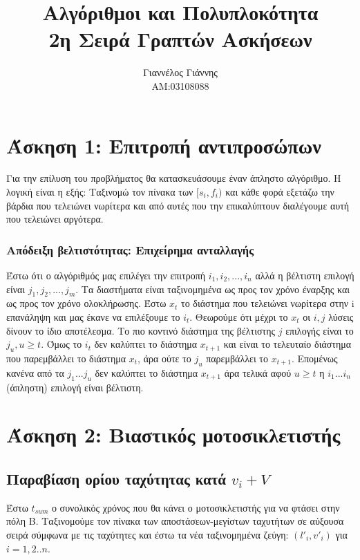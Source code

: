 \documentclass[a4paper,12pt]{report}
\title{ Αλγόριθμοι και Πολυπλοκότητα \\ 2η Σειρά Γραπτών Ασκήσεων}
\author{Γιαννέλος Γιάννης\\ΑΜ:03108088}
\begin{document}
\maketitle

\section*{Άσκηση 1: Επιτροπή αντιπροσώπων}
Για την επίλυση του προβλήματος θα κατασκευάσουμε έναν άπληστο αλγόριθμο. Η λογική είναι η εξής: Ταξινομώ τον πίνακα των $[s_i,f_i)$ και κάθε φορά εξετάζω την βάρδια που τελειώνει νωρίτερα και από αυτές που την επικαλύπτουν διαλέγουμε αυτή που τελειώνει αργότερα.
\subsubsection*{Απόδειξη βελτιστότητας: Επιχείρημα ανταλλαγής}
Έστω ότι ο αλγόριθμός μας επιλέγει την επιτροπή $i_1,i_2,...,i_n$ αλλά η βέλτιστη επιλογή είναι $j_1,j_2,...,j_m$. Τα διαστήματα είναι ταξινομημένα ως προς τον χρόνο έναρξης και ως προς τον χρόνο ολοκλήρωσης. Έστω $x_t$ το διάστημα που τελειώνει νωρίτερα στην i επανάληψη και μας έκανε να επιλέξουμε το $i_t$. Θεωρούμε ότι μέχρι το $x_t$ οι $i,j$ λύσεις δίνουν το ίδιο αποτέλεσμα. Το πιο κοντινό διάστημα της βέλτιστης $j$ επιλογής είναι το $j_u,u\geq t$. Όμως το $i_t$ δεν καλύπτει το διάστημα $x_{t+1}$ και είναι το τελευταίο διάστημα που παρεμβάλλει το διάστημα $x_t$, άρα ούτε το $j_u$ παρεμβάλλει το $x_{t+1}$. Επομένως κανένα από τα $j_1...j_u$ δεν καλύπτει το διάστημα $x_{t+1}$ άρα τελικά αφού $u \geq t$ η $i_1...i_n$ (άπληστη) επιλογή είναι βέλτιστη.


\section*{Άσκηση 2: Βιαστικός μοτοσικλετιστής}
\subsection*{Παραβίαση ορίου ταχύτητας κατά $v_i+V$}
Έστω $t_{sum}$ ο συνολικός χρόνος που θα κάνει ο μοτοσικλετιστής για να φτάσει στην πόλη Β. Ταξινομούμε τον πίνακα των αποστάσεων-μεγίστων ταχυτήτων σε αύξουσα σειρά σύμφωνα με τις ταχύτητες και έστω τα νέα ταξινομημένα ζεύγη: $(l'_i,v'_i)$ για $i=1,2..n$.
\end{document}
